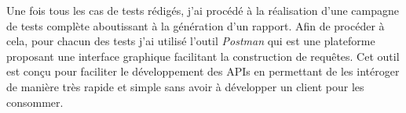 Une fois tous les cas de tests rédigés, j'ai procédé à la réalisation d'une campagne de tests complète aboutissant à la génération d'un rapport. Afin de procéder à cela, pour chacun des tests j'ai utilisé l'outil \textit{Postman} qui est une plateforme proposant une interface graphique facilitant la construction de requêtes. Cet outil est conçu pour faciliter le développement des APIs en permettant de les intéroger de manière très rapide et simple sans avoir à développer un client pour les consommer. 